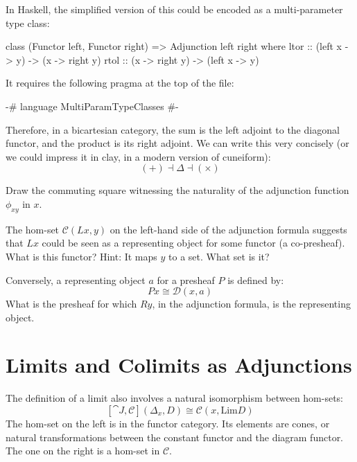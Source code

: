 \documentclass[DaoFP]{subfiles}
\begin{document}
In Haskell, the simplified version of this could be encoded as a multi-parameter type class:
\begin{haskell}
class (Functor left, Functor right) => Adjunction left right where
  ltor :: (left x -> y) -> (x -> right y)
  rtol :: (x -> right y) -> (left x -> y)
\end{haskell}
It requires the following pragma at the top of the file:
\begin{haskell}
{-# language MultiParamTypeClasses #-}
\end{haskell}



Therefore, in a bicartesian category, the sum is the left adjoint to the diagonal functor, and the product is its right adjoint. We can write this very concisely (or we could impress it in clay, in a modern version of cuneiform):
\[ (+) \dashv \Delta \dashv (\times) \]

\begin{exercise}
Draw the commuting square witnessing the naturality of the adjunction function $\phi_{x y}$ in $x$.
\end{exercise}

\begin{exercise}
The hom-set $\mathcal{C} (L x, y)$ on the left-hand side of the adjunction formula suggests that $L x$ could be seen as a representing object for some functor (a co-presheaf). What is this functor? Hint: It maps $y$ to a set. What set is it?
\end{exercise}

\begin{exercise}
Conversely, a representing object $a$ for a presheaf $P$ is defined by:
\[P x \cong \mathcal{D}(x, a)\]
What is the presheaf for which $R y$, in the adjunction formula, is the representing object.
\end{exercise}

\section{Limits and Colimits as Adjunctions}

The definition of a limit also involves a natural isomorphism between hom-sets:
\[ [\cat J, \mathcal{C}](\Delta_x, D)  \cong \mathcal{C}(x, \text{Lim} D) \]
The hom-set on the left is in the functor category. Its elements are cones, or natural transformations between the constant functor and the diagram functor. The one on the right is a hom-set in $\mathcal{C}$. 
\end{document}

